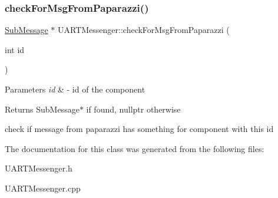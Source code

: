 \subsubsection{\texorpdfstring{check\+For\+Msg\+From\+Paparazzi()}{checkForMsgFromPaparazzi()}}
{\footnotesize\ttfamily \hyperlink{struct_sub_message}{Sub\+Message} $\ast$ U\+A\+R\+T\+Messenger\+::check\+For\+Msg\+From\+Paparazzi (\begin{DoxyParamCaption}\item[{int}]{id }\end{DoxyParamCaption})}


\begin{DoxyParams}{Parameters}
{\em id} & -\/ id of the component \\
\hline
\end{DoxyParams}
\begin{DoxyReturn}{Returns}
Sub\+Message$\ast$ if found, nullptr otherwise
\end{DoxyReturn}
check if message from paparazzi has something for component with this id 

The documentation for this class was generated from the following files\+:\begin{DoxyCompactItemize}
\item 
U\+A\+R\+T\+Messenger.\+h\item 
U\+A\+R\+T\+Messenger.\+cpp\end{DoxyCompactItemize}
